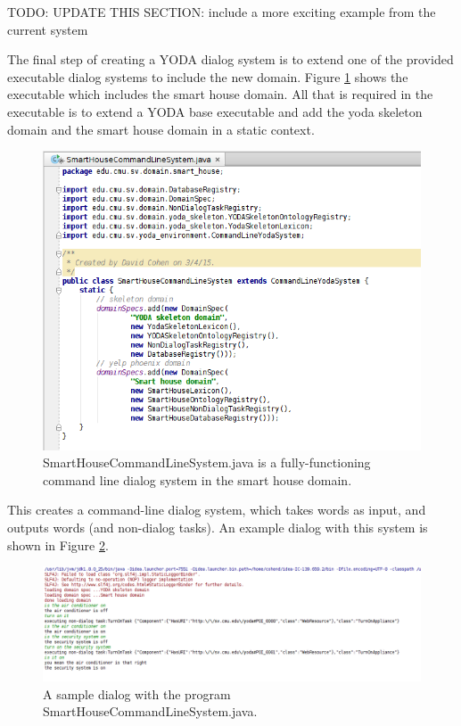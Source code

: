 \documentclass[titlepage]{article}
\begin{document}
TODO: UPDATE THIS SECTION: include a more exciting example from the current system

The final step of creating a YODA dialog system is to extend one of the provided executable dialog systems to include the new domain.
Figure \ref{fig:smart_house_command_line_system} shows the executable which includes the smart house domain.
All that is required in the executable is to extend a YODA base executable and add the yoda skeleton domain and the smart house domain in a static context.

\begin{figure}[h!]
\centering
\includegraphics[width=\textwidth]{SmartHouseCommandLineExecutable}
\caption{SmartHouseCommandLineSystem.java is a fully-functioning command line dialog system in the smart house domain.}
\label{fig:smart_house_command_line_system}
\end{figure}

This creates a command-line dialog system, which takes words as input, and outputs words (and non-dialog tasks).
An example dialog with this system is shown in Figure \ref{fig:smart_house_demo}.

\begin{figure}[h!]
\centering
\includegraphics[width=\textwidth]{SmartHouseDemoDialog}
\caption{A sample dialog with the program SmartHouseCommandLineSystem.java.}
\label{fig:smart_house_demo}
\end{figure}


\clearpage
\glsaddall
\printglossary[type=main,nonumberlist]
\end{document}
